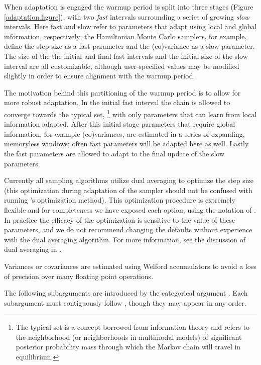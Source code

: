 When adaptation is engaged the warmup period is split into three
stages (Figure \ref{adaptation.figure}), with two \textit{fast} intervals
surrounding a series of growing \textit{slow} intervals.  Here fast
and slow refer to parameters that adapt using local and global
information, respectively; the Hamiltonian Monte Carlo samplers,
for example, define the step size as a fast parameter and
the (co)variance as a slow parameter.  The size of the the initial
and final fast intervals and the initial size of the slow interval
are all customizable, although user-specified values may be modified
slightly in order to ensure alignment with the warmup period.

The motivation behind this partitioning of the warmup period is to
allow for more robust adaptation.  In the initial fast interval the
chain is allowed to converge towards the typical set,%
%
\footnote{The typical set is a concept borrowed from information
theory and refers to the neighborhood (or neighborhoods in multimodal models)
of significant posterior probability mass through which the Markov chain
will travel in equilibrium.}
%
with only parameters that can learn from local information adapted.
After this initial stage parameters that require global information,
for example (co)variances, are estimated in a series of expanding,
memoryless windows; often fast parameters will be adapted here
as well.  Lastly the fast parameters are allowed to adapt to the final
update of the slow parameters.

Currently all \Stan sampling algorithms utilize dual averaging to
optimize the step size (this optimization during adaptation of the
sampler should not be confused with running \Stan's optimization method).
This optimization procedure is extremely flexible and for completeness
we have exposed each option, using the notation of
\citep{Hoffman-Gelman:2011, Hoffman-Gelman:2014}.  In practice the
efficacy of the optimization is sensitive to the value of these
parameters, and we do not recommend changing the defaults without
experience with the dual averaging algorithm.  For more information,
see the discussion of dual averaging in \citep{Hoffman-Gelman:2011,
 Hoffman-Gelman:2014}.

Variances or covariances are estimated using Welford accumulators
to avoid a loss of precision over many floating point operations.

The following subarguments are introduced by the categorical argument
.  Each subargument must contiguously follow ,
though they may appear in any order.

